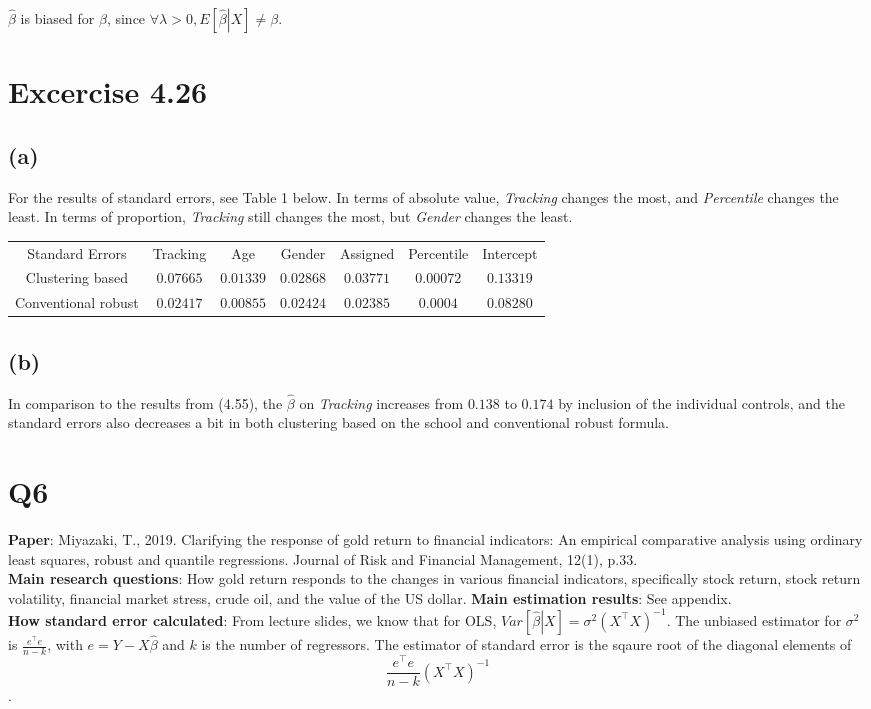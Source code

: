 \documentclass{article}
\begin{document}
$\hat{\beta}$ is biased for $\beta $, since $\forall \lambda >0,E\left[
\left. \hat{\beta}\right\vert X\right] \neq \beta .$

\section*{Excercise 4.26}

\subsection*{(a)}
For the results of standard errors, see Table 1 below. In terms of absolute value, \textit{Tracking} changes the most, and \textit{Percentile} changes the least. In terms of proportion, \textit{Tracking} still changes the most, but \textit{Gender} changes the least.

	\begin{center}
	\begin{tabular}{ccccccc}
		\hline\hline
		Standard Errors& Tracking & Age & Gender & Assigned & Percentile & Intercept \\ \cline{2-7}
		Clustering based & $0.07665$ & $0.01339$ & $0.02868$ & $0.03771$ & $0.00072$
		& $0.13319$ \\ 
		Conventional robust & $0.02417$ & $0.00855$ & $%
		0.02424$ & $0.02385$ & $0.0004$ & $0.08280$ \\ \hline\hline
	\end{tabular}
	\end{center}



\subsection*{(b)}
In comparison to the results from (4.55), the $\hat{\beta}$ on \textit{Tracking} increases from $0.138$ to $0.174$ by inclusion of the individual controls, and the standard errors also decreases a bit in both clustering based on the school and conventional robust formula.

\section*{Q6}
\textbf{Paper}: Miyazaki, T., 2019. Clarifying the response of gold return to financial indicators: An empirical comparative analysis using ordinary least squares, robust and quantile regressions. Journal of Risk and Financial Management, 12(1), p.33.\\
\textbf{Main research questions}: How gold return responds to the changes in various financial indicators, specifically stock return, stock return volatility,
financial market stress, crude oil, and the value of the US dollar.
\textbf{Main estimation results}: See appendix.\\
\textbf{How standard error calculated}: From lecture slides, we know that for OLS, $Var\left[ \left. \hat{\beta} \right| X \right] =\sigma^2\left( X^{\intercal}X\right)^{-1} $. The unbiased estimator for $\sigma^2$ is $\frac{e^{\intercal}e}{n-k}$, with $e=Y-X\hat{\beta}$ and $k$ is the number of regressors. The estimator of standard error is the sqaure root of the diagonal elements of $$\frac{e^{\intercal}e}{n-k}\left( X^{\intercal}X\right)^{-1}$$.
\end{document}
